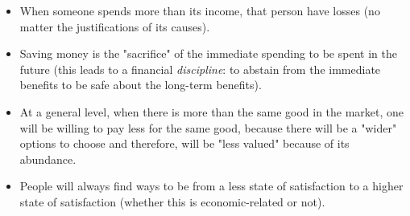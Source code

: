 \documentclass[12pt,a4paper,twoside]{book}
\begin{document}
\begin{itemize}
\item When someone spends more than its income, that person have losses (no matter the justifications of its causes).
\item Saving money is the "sacrifice" of the immediate spending to be spent in the future (this leads to a financial \textit{discipline}: to abstain from the immediate benefits to be safe about the long-term benefits).
\item At a general level, when there is more than the same good in the market, one will be willing to pay less for the same good, because there will be a "wider" options to choose and therefore, will be "less valued" because of its abundance.
\item People will always find ways to be from a less state of satisfaction to a higher state of satisfaction (whether this is economic-related or not).
\end{itemize}
\end{document}
